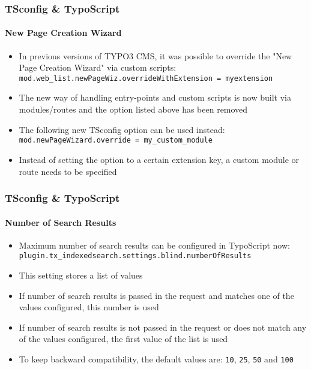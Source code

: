 \begin{frame}[fragile]
	\frametitle{TSconfig \& TypoScript}
	\framesubtitle{New Page Creation Wizard}

	\begin{itemize}
		\item In previous versions of TYPO3 CMS, it was possible to override the "New Page Creation Wizard"
			via custom scripts:\newline
			\small
				\texttt{mod.web\_list.newPageWiz.overrideWithExtension = myextension}
			\normalsize
		\item The new way of handling entry-points and custom scripts is now built via modules/routes
			and the option listed above has been removed
		\item The following new TSconfig option can be used instead:
			\small
				\texttt{mod.newPageWizard.override = my\_custom\_module}
			\normalsize

		\item Instead of setting the option to a certain extension key, a custom module or
			route needs to be specified

	\end{itemize}

\end{frame}
\begin{frame}[fragile]
	\frametitle{TSconfig \& TypoScript}
	\framesubtitle{Number of Search Results}

	\begin{itemize}
		\item Maximum number of search results can be configured in TypoScript now:\newline
			\texttt{plugin.tx\_indexedsearch.settings.blind.numberOfResults}
		\item This setting stores a list of values
		\item If number of search results is passed in the request and matches one of the values
			configured, this number is used
		\item If number of search results is not passed in the request or does not match any of
			the values configured, the first value of the list is used
		\item To keep backward compatibility, the default values are:\newline
			\texttt{10}, \texttt{25}, \texttt{50} and \texttt{100}
	\end{itemize}

\end{frame}
